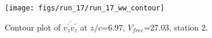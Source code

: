 \begin{figure}[H]
\centering
\texttt{[image: figs/run\_17/run\_17\_ww\_contour]}
\caption{Contour plot of $\overline{v_{z}^{\prime} v_{z}^{\prime}}$ at $z/c$=6.97, $V_{free}$=27.03, station 2.}
\label{fig:run_17_ww_contour}
\end{figure}


